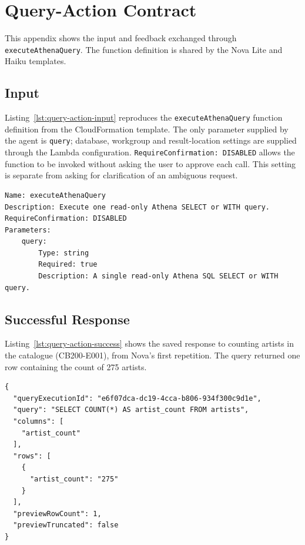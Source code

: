 \clearpage
\section{Query-Action Contract}
\label{app:query-action-contract}

This appendix shows the input and feedback exchanged through
\texttt{executeAthenaQuery}. The function definition is shared by the Nova Lite
and Haiku templates.

\subsection{Input}

Listing~\ref{lst:query-action-input} reproduces the
\texttt{executeAthenaQuery} function definition from the CloudFormation template.
The only parameter supplied by the agent is
\texttt{query}; database, workgroup and result-location settings are supplied
through the Lambda configuration.
\texttt{RequireConfirmation: DISABLED} allows the function to be invoked
without asking the user to approve each call. This setting is separate from
asking for clarification of an ambiguous request.

\begingroup
{}
\begin{minipage}{\textwidth}
\begin{lstlisting}[caption={Query-action definition.},label={lst:query-action-input}]
Name: executeAthenaQuery
Description: Execute one read-only Athena SELECT or WITH query.
RequireConfirmation: DISABLED
Parameters:
    query:
        Type: string
        Required: true
        Description: A single read-only Athena SQL SELECT or WITH query.
\end{lstlisting}
\end{minipage}

\subsection{Successful Response}

Listing~\ref{lst:query-action-success} shows the saved response to counting
artists in the catalogue (CB200-E001), from Nova's first repetition.
The query returned one row containing the count of 275 artists.

\begin{minipage}{\textwidth}
\begin{lstlisting}[caption={Saved artist-count response.},label={lst:query-action-success}]
{
  "queryExecutionId": "e6f07dca-dc19-4cca-b806-934f300c9d1e",
  "query": "SELECT COUNT(*) AS artist_count FROM artists",
  "columns": [
    "artist_count"
  ],
  "rows": [
    {
      "artist_count": "275"
    }
  ],
  "previewRowCount": 1,
  "previewTruncated": false
}
\end{lstlisting}
\end{minipage}

